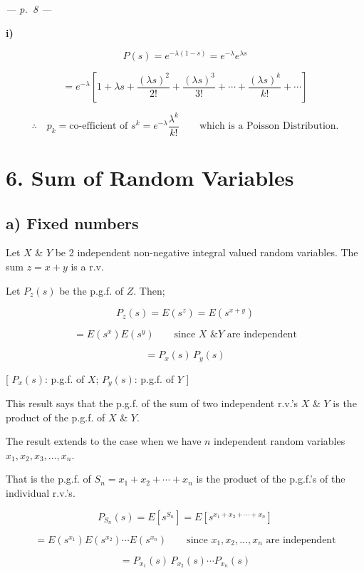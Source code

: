 \documentclass[
]{article}
\begin{document}
\emph{--- p.~8 ---}

\textbf{i)}

\[P(s) = e^{-\lambda(1-s)} = e^{-\lambda} e^{\lambda s}\]

\[= e^{-\lambda} \left[ 1 + \lambda s + \frac{(\lambda s)^2}{2!} + \frac{(\lambda s)^3}{3!} + \cdots + \frac{(\lambda s)^k}{k!} + \cdots \right]\]

\[\therefore \quad p_k = \text{co-efficient of } s^k = e^{-\lambda} \frac{\lambda^k}{k!} \qquad \text{which is a Poisson Distribution.}\]

\section{6. Sum of Random Variables}\label{sum-of-random-variables}

\subsection{a) Fixed numbers}\label{a-fixed-numbers}

Let \(X\) \& \(Y\) be 2 independent non-negative integral valued random
variables. The sum \(z = x + y\) is a r.v.

Let \(P_z(s)\) be the p.g.f. of \(Z\). Then;

\[P_z(s) = E\left(s^z\right) = E\left(s^{x+y}\right)\]

\[= E\left(s^x\right) E\left(s^y\right) \qquad \text{since } X \text{ \& } Y \text{ are independent}\]

\[= P_x(s)\, P_y(s)\]

{[} \(P_x(s)\): p.g.f. of \(X\); \(P_y(s)\): p.g.f. of \(Y\) {]}

This result says that the p.g.f. of the sum of two independent r.v.'s
\(X\) \& \(Y\) is the product of the p.g.f. of \(X\) \& \(Y\).

The result extends to the case when we have \(n\) independent random
variables \(x_1, x_2, x_3, \ldots, x_n\).

That is the p.g.f. of \(S_n = x_1 + x_2 + \cdots + x_n\) is the product
of the p.g.f.'s of the individual r.v.'s.

\[P_{S_n}(s) = E\left[s^{S_n}\right] = E\left[s^{x_1 + x_2 + \cdots + x_n}\right]\]

\[= E\left(s^{x_1}\right) E\left(s^{x_2}\right) \cdots E\left(s^{x_n}\right) \qquad \text{since } x_1, x_2, \ldots, x_n \text{ are independent}\]

\[= P_{x_1}(s)\, P_{x_2}(s) \cdots P_{x_n}(s)\]
\end{document}
